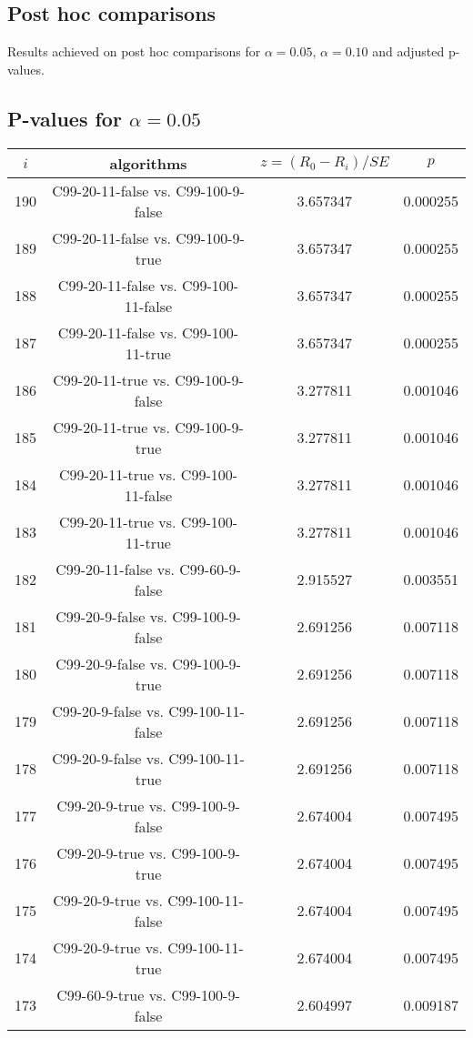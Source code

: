 \documentclass[a4paper,10pt]{article}
\begin{document}
\begin{landscape}
\pagebreak

\section{Post hoc comparisons}

Results achieved on post hoc comparisons for $\alpha = 0.05$, $\alpha = 0.10$ and adjusted p-values.

\subsection{P-values for $\alpha=0.05$}

\begin{table}[!htp]
\centering\scriptsize
\begin{tabular}{cccc}
$i$&algorithms&$z=(R_0 - R_i)/SE$&$p$\\
\hline190&C99-20-11-false vs. C99-100-9-false&3.657347&0.000255\\
189&C99-20-11-false vs. C99-100-9-true&3.657347&0.000255\\
188&C99-20-11-false vs. C99-100-11-false&3.657347&0.000255\\
187&C99-20-11-false vs. C99-100-11-true&3.657347&0.000255\\
186&C99-20-11-true vs. C99-100-9-false&3.277811&0.001046\\
185&C99-20-11-true vs. C99-100-9-true&3.277811&0.001046\\
184&C99-20-11-true vs. C99-100-11-false&3.277811&0.001046\\
183&C99-20-11-true vs. C99-100-11-true&3.277811&0.001046\\
182&C99-20-11-false vs. C99-60-9-false&2.915527&0.003551\\
181&C99-20-9-false vs. C99-100-9-false&2.691256&0.007118\\
180&C99-20-9-false vs. C99-100-9-true&2.691256&0.007118\\
179&C99-20-9-false vs. C99-100-11-false&2.691256&0.007118\\
178&C99-20-9-false vs. C99-100-11-true&2.691256&0.007118\\
177&C99-20-9-true vs. C99-100-9-false&2.674004&0.007495\\
176&C99-20-9-true vs. C99-100-9-true&2.674004&0.007495\\
175&C99-20-9-true vs. C99-100-11-false&2.674004&0.007495\\
174&C99-20-9-true vs. C99-100-11-true&2.674004&0.007495\\
173&C99-60-9-true vs. C99-100-9-false&2.604997&0.009187\\

\end{tabular}
\end{table}
\end{landscape}
\end{document}
